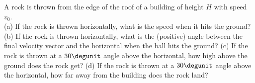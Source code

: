 A rock is thrown from the edge of the roof of a building of height
$H$ with speed $v_0$.\\
%
(a) If the rock is thrown horizontally, what is the speed when it hits
the ground?\answercheck\hwendpart
%
(b) If the rock is thrown horizontally, what is the (positive) angle
between the final velocity vector and the horizontal when the ball
hits the ground?\answercheck\hwendpart
%
(c) If the rock is thrown at a $30\degunit$ angle above the
horizontal, how high above the ground does the rock get?\answercheck\hwendpart
%
(d) If the rock is thrown at a $30\degunit$ angle above the
horizontal, how far away from the building does the rock land?\answercheck
